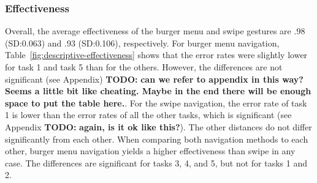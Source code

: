 \documentclass{sig-alternate-05-2015}
\newcommand{\todo}{\textbf{TODO:} \textbf}
\begin{document}
\subsubsection{Effectiveness}
Overall, the average effectiveness of the burger menu and swipe gestures are .98 (SD:\@0.063) and .93 (SD:\@0.106), respectively. For burger menu navigation, 
Table~\ref{fig:descriptive-effectiveness} shows that the error rates were slightly lower for task 1 and task 5 than for the others. However, the differences
are not significant (see Appendix) \todo{can we refer to appendix in this way? Seems a little bit like cheating. Maybe in the end there will be enough space to put the 
table here.}. For the swipe navigation, the error rate of task 1 is lower than the error rates of all the other
tasks, which is significant (see Appendix \todo{again, is it ok like this?}).
The other distances do not differ significantly from each other. When
comparing both navigation methods to each other, burger menu navigation yields a higher effectiveness than swipe in any case.
The differences are significant for tasks 3, 4, and 5,
but not for tasks 1 and 2.
\begin{table}[!h]
\centering
\caption{Mean (standard deviation) of effectiveness}
\label{fig:descriptive-effectiveness}
\end{table}
\end{document}
